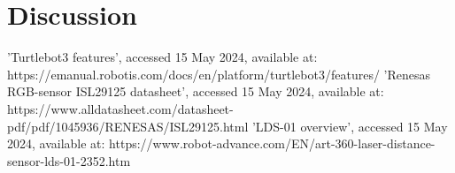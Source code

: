 \documentclass[conference]{IEEEtran}
\begin{document}
\section{Discussion}


\begin{thebibliography}{00}
 'Turtlebot3 features', accessed 15 May 2024, available at: https://emanual.robotis.com/docs/en/platform/turtlebot3/features/
 'Renesas RGB-sensor ISL29125 datasheet', accessed 15 May 2024, available at: https://www.alldatasheet.com/datasheet-pdf/pdf/1045936/RENESAS/ISL29125.html
 'LDS-01 overview', accessed 15 May 2024, available at: https://www.robot-advance.com/EN/art-360-laser-distance-sensor-lds-01-2352.htm
\end{thebibliography}
\end{document}
